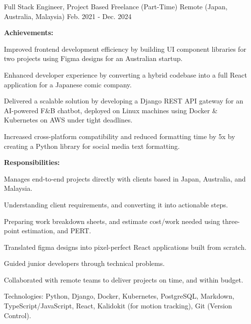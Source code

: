 

\begin{cventries}


  \cventry
    {Full Stack Engineer, Project Based} %
    {Freelance (Part-Time)} %
    {Remote (Japan, Australia, Malaysia)} %
    {Feb. 2021 - Dec. 2024} %
    {
      \textbf{Achievements:}
      \vspace{1.5em}
      \begin{cvitems} %
        \item {Improved frontend development efficiency by building UI component libraries for two projects using Figma designs for an Australian startup.}
        \item {Enhanced developer experience by converting a hybrid codebase into a full React application for a Japanese comic company.}
        \item {Delivered a scalable solution by developing a Django REST API gateway for an AI-powered F\&B chatbot, deployed on Linux machines using Docker \& Kubernetes on AWS under tight deadlines.}
        \item {Increased cross-platform compatibility and reduced formatting time by 5x by creating a Python library for social media text formatting.}
      \end{cvitems}
      \vspace{1.5em}
      \textbf{Responsibilities:}
      \vspace{1.5em}
      \begin{cvitems} %
        \item {Manages end-to-end projects directly with clients based in Japan, Australia, and Malaysia.}
        \item {Understanding client requirements, and converting it into actionable steps.}
        \item {Preparing work breakdown sheets, and estimate cost/work needed using three-point estimation, and PERT.}
        \item {Translated figma designs into pixel-perfect React applications built from scratch.}
        \item {Guided junior developers through technical problems.}
        \item {Collaborated with remote teams to deliver projects on time, and within budget.}
        \item {Technologies: Python, Django, Docker, Kubernetes, PostgreSQL, Markdown, TypeScript/JavaScript, React, Kalidokit (for motion tracking), Git (Version Control).}
      \end{cvitems}
    }


\end{cventries}
